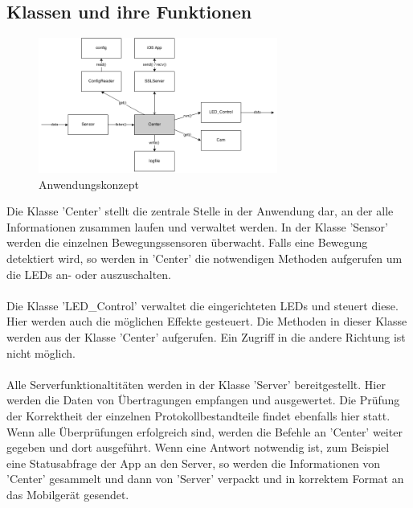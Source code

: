 
\subsection{Klassen und ihre Funktionen}
\begin{figure}
	\vspace{-20pt}
	\begin{center}
		\includegraphics[width=0.7\textwidth]{./data/ApplicationConcept.png}
	\end{center}
	\vspace{-20pt}
	\caption{Anwendungskonzept}
	\vspace{-10pt}
\end{figure}
Die Klasse 'Center' stellt die zentrale Stelle in der Anwendung dar, an der alle Informationen zusammen laufen und verwaltet werden. In der Klasse 'Sensor' werden die einzelnen Bewegungssensoren überwacht. Falls eine Bewegung detektiert wird, so werden in 'Center' die notwendigen Methoden aufgerufen um die LEDs an- oder auszuschalten.\\\\
Die Klasse 'LED\_Control' verwaltet die eingerichteten LEDs und steuert diese. Hier werden auch die möglichen Effekte gesteuert. Die Methoden in dieser Klasse werden aus der Klasse 'Center' aufgerufen. Ein Zugriff in die andere Richtung ist nicht möglich. \\\\
Alle Serverfunktionaltitäten werden in der Klasse 'Server' bereitgestellt. Hier werden die Daten von Übertragungen empfangen und ausgewertet. Die Prüfung der Korrektheit der einzelnen Protokollbestandteile findet ebenfalls hier statt. Wenn alle Überprüfungen erfolgreich sind, werden die Befehle an 'Center' weiter gegeben und dort ausgeführt. Wenn eine Antwort notwendig ist, zum Beispiel eine Statusabfrage der App an den Server, so werden die Informationen von 'Center' gesammelt und dann von 'Server' verpackt und in korrektem Format an das Mobilgerät gesendet. \\\\
